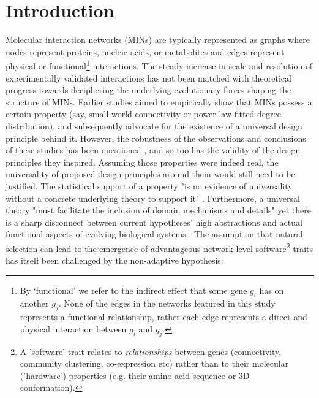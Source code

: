 \section{Introduction}
        Molecular interaction networks (MINs) are typically represented as graphs where nodes represent proteins, nucleic acids, or metabolites and edges represent physical or functional\footnote{
            By `functional' we refer to the indirect effect that some gene $g_i$ has on another $g_j$. None of the edges in the networks featured in this study represents a functional relationship, rather each edge represents a direct and physical interaction between  $g_i$ and  $g_j$.
        } interactions. The steady increase in scale \cite{rolland_proteome-scale_2014} and resolution \cite{yang_widespread_2016} of experimentally validated interactions has not been matched with theoretical progress towards deciphering the underlying evolutionary forces shaping the structure of MINs. Earlier studies aimed to empirically show that MINs possess a certain property (say, small-world connectivity or power-law-fitted degree distribution), and subsequently advocate for the existence of a universal design principle behind it. However, the robustness of the observations and conclusions of these studies \cite{barabasi_emergence_1999, fell_small_2000} has been questioned \cite{arita_metabolic_2004, tanaka_protein_2005, fox_keller_revisiting_2005, khanin_how_2006}, and so too \cite{stelling_robustness_2004, hahn_molecular_2004} %
        has the validity of the design principles \cite{albert_error_2000, barabasi_network_2004} they inspired. Assuming those properties were indeed real, the universality of proposed design principles around them would still need to be justified. The statistical support of a property "is no evidence of universality without a concrete underlying theory to support it" \cite{stumpf_critical_2012}. Furthermore, a universal theory "must facilitate the inclusion of domain mechanisms and details" yet there is a sharp disconnect between current hypotheses' high abstractions and actual functional aspects of evolving biological systems \cite{alderson_contrasting_2010}.
        The assumption that natural selection can lead to the emergence of advantageous network-level software\footnote{A 'software' trait relates to \textit{relationships} between genes (connectivity, community clustering, co-expression etc) rather than to their molecular ('hardware') properties (e.g. their amino acid sequence or 3D conformation).} traits has itself been challenged by the non-adaptive hypothesis: %
